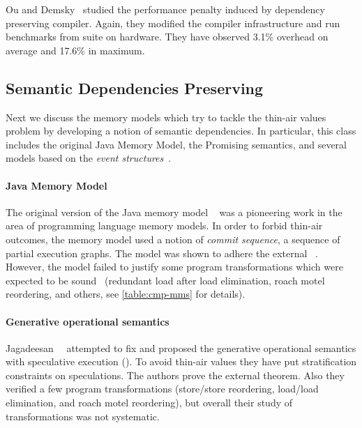 Ou and Demsky~\cite{Ou-Demsky:OOPSLA18} studied 
the performance penalty induced by dependency preserving compiler. 
Again, they modified the \LLVM compiler infrastructure 
and run benchmarks from \SPECCPU suite on  hardware. 
They have observed 3.1\% overhead on average and 17.6\% in maximum. 

\subsection{Semantic Dependencies Preserving}
\label{sec:catalog:sdeprf}

Next we discuss the memory models 
which try to tackle the thin-air values problem 
by developing a notion of semantic dependencies. 
In particular, this class includes the original Java Memory Model, 
the Promising semantics, and several models based 
on the \emph{event structures}~\cite{Winskel:86}.

\paragraph{Java Memory Model}
\label{sec:catalog:jmm}

The original version of the Java memory model \JMM~\cite{Manson-al:POPL05}
was a pioneering work in the area of programming language memory models. 
In order to forbid thin-air outcomes, the memory model used 
a notion of \emph{commit sequence}, \ie a sequence of partial execution graphs.
The model was shown to adhere the external \DRF~\cite{Huisman-Petri:CONCUR07}.
However, the model failed to justify some program transformations 
which were expected to be sound~\cite{Sevcik-Aspinall:ECOOP08} 
(\eg redundant load after load elimination, roach motel reordering, and others,
see \cref{table:cmp-mms} for details). 

\paragraph{Generative operational semantics}

Jagadeesan~\etal~\cite{Jagadeesan-al:ESOP10} attempted to fix \JMM 
and proposed the generative operational semantics 
with speculative execution (\GOS).
To avoid thin-air values they have put stratification constraints 
on speculations. The authors prove the external \DRF theorem. 
Also they verified a few program transformations 
(store/store reordering, load/load elimination, and roach motel reordering), 
but overall their study of transformations was not systematic.  

